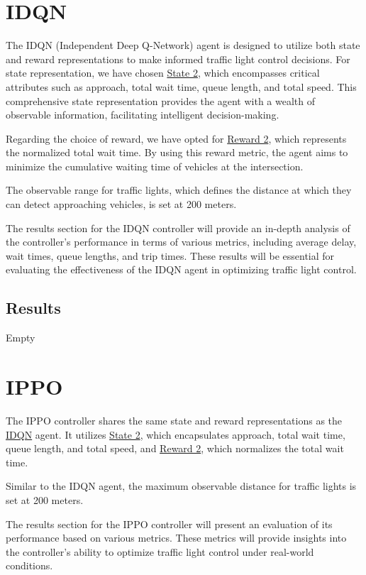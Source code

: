 \section{IDQN} \label{sec:exp-idqn}
The IDQN (Independent Deep Q-Network) agent is designed to utilize both state and reward representations to make informed traffic light control decisions. For state representation, we have chosen \hyperref[subsec:state-2]{State 2}, which encompasses critical attributes such as approach, total wait time, queue length, and total speed. This comprehensive state representation provides the agent with a wealth of observable information, facilitating intelligent decision-making.

Regarding the choice of reward, we have opted for \hyperref[subsec:reward-2]{Reward 2}, which represents the normalized total wait time. By using this reward metric, the agent aims to minimize the cumulative waiting time of vehicles at the intersection.

The observable range for traffic lights, which defines the distance at which they can detect approaching vehicles, is set at 200 meters.

The results section for the IDQN controller will provide an in-depth analysis of the controller's performance in terms of various metrics, including average delay, wait times, queue lengths, and trip times. These results will be essential for evaluating the effectiveness of the IDQN agent in optimizing traffic light control.

\subsection{Results}
Empty

\section{IPPO}
The IPPO controller shares the same state and reward representations as the \hyperref[sec:exp-idqn]{IDQN} agent. It utilizes \hyperref[subsec:state-2]{State 2}, which encapsulates approach, total wait time, queue length, and total speed, and \hyperref[subsec:reward-2]{Reward 2}, which normalizes the total wait time.

Similar to the IDQN agent, the maximum observable distance for traffic lights is set at 200 meters.

The results section for the IPPO controller will present an evaluation of its performance based on various metrics. These metrics will provide insights into the controller's ability to optimize traffic light control under real-world conditions.

